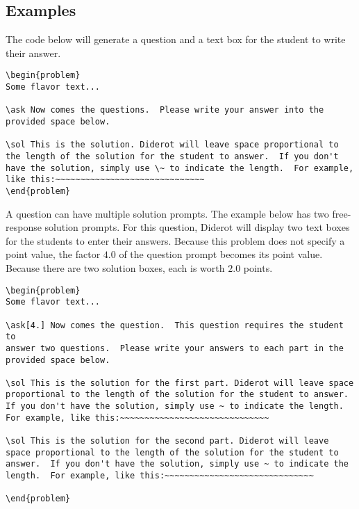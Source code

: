 \subsection{Examples}

\begin{example}
The code below will generate a question and a text box for the student
to write their answer.

\begin{lstlisting}
\begin{problem}
Some flavor text...

\ask Now comes the questions.  Please write your answer into the
provided space below.

\sol This is the solution. Diderot will leave space proportional to
the length of the solution for the student to answer.  If you don't
have the solution, simply use \~ to indicate the length.  For example,
like this:~~~~~~~~~~~~~~~~~~~~~~~~~~~~~~
\end{problem}
\end{lstlisting}

\end{example}

\begin{example}

A question can have multiple solution prompts.  The example below has
two free-response solution prompts. For this question, Diderot will
display two text boxes for the students to enter their answers.
%
Because this problem does not specify a point value, the factor $4.0$
of the question prompt becomes its point value.
%
Because there are two solution boxes, each is worth $2.0$ points.

\begin{lstlisting}
\begin{problem}
Some flavor text...

\ask[4.] Now comes the question.  This question requires the student to
answer two questions.  Please write your answers to each part in the
provided space below.

\sol This is the solution for the first part. Diderot will leave space
proportional to the length of the solution for the student to answer.
If you don't have the solution, simply use ~ to indicate the length.
For example, like this:~~~~~~~~~~~~~~~~~~~~~~~~~~~~~~

\sol This is the solution for the second part. Diderot will leave
space proportional to the length of the solution for the student to
answer.  If you don't have the solution, simply use ~ to indicate the
length.  For example, like this:~~~~~~~~~~~~~~~~~~~~~~~~~~~~~~

\end{problem}
\end{lstlisting}

\end{example}

